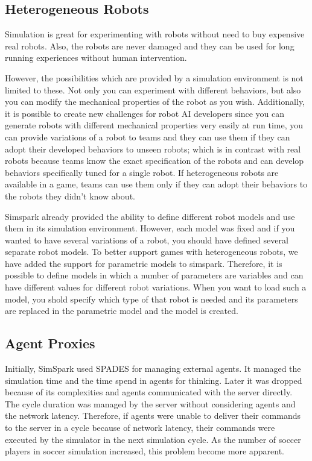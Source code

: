 \documentclass{llncs}
\begin{document}
\subsection{Heterogeneous Robots}
Simulation is great for experimenting with robots without need to buy expensive 
real robots. Also, the robots are never damaged and they can be used for long 
running experiences without human intervention. 

However, the possibilities which are provided by a simulation environment is 
not limited to these. Not only you can experiment with different behaviors, but
also you can modify the mechanical properties of the robot as you wish. Additionally,
it is possible to create new challenges for robot AI developers since you can
generate robots with different mechanical properties very easily at run time, 
you can provide variations of a robot to teams and they can use them if they can
adopt their developed behaviors to unseen robots; which is in contrast with 
real robots because teams know the exact specification of the robots and
can develop behaviors specifically tuned for a single robot. If heterogeneous 
robots are available in a game, teams can use them only if they can adopt
their behaviors to the robots they didn't know about.

Simspark already provided the ability to define different robot models and 
use them in its simulation environment. However, each model was fixed and if you
wanted to have several variations of a robot, you should have defined several 
separate robot models. To better support games with heterogeneous robots, we have
added the support for parametric models to simspark. Therefore, it is possible to
define models in which a number of parameters are variables and can have different
values for different robot variations. When you want to load such a model, you shold 
specify which type of that robot is needed and its parameters are replaced in the
parametric model and the model is created. 

\subsection{Agent Proxies}
Initially, SimSpark used SPADES\cite{riley2003spades} for managing external agents. It
managed the simulation time and the time spend in agents for thinking. Later it was
dropped because of its complexities and agents communicated with the server directly.
The cycle duration was managed by the server without considering agents and the network
latency. Therefore, if agents were unable to deliver their commands to the server in a
cycle because of network latency, their commands were executed by the simulator
in the next simulation cycle. As the number of soccer players in soccer simulation 
increased, this problem become more apparent.
\end{document}
